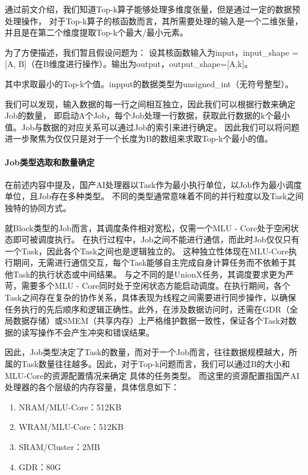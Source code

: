         通过前文介绍，我们知道Top-k算子能够处理多维度张量，但是通过一定的数据预处理操作，
        对于Top-k算子的核函数而言，其所需要处理的输入是一个二维张量，并且是在第二个维度提取Top-k个最大/最小元素。
        
        为了方便描述，我们暂且假设问题为：
        设其核函数输入为input，input\_shape = [A, B]（在B维度进行操作）。输出为output，output\_shape=[A,k]。

        其中求取最小的Top-k个值。inpput的数据类型为unsigned\_int（无符号整型）。
        
        我们可以发现，输入数据的每一行之间相互独立，因此我们可以根据行数来确定Job的数量，
        即启动A个Job，每个Job处理一行数据，获取此行数据的k个最小值。Job与数据的对应关系可以通过Job的索引来进行确定。
        因此我们可以将问题进一步聚焦为仅仅只是对于一个长度为B的数组来求取Top-k个最小的值。

        
        \paragraph{Job类型选取和数量确定}
        在前述内容中提及，国产AI处理器以Task作为最小执行单位，以Job作为最小调度单位，且Job存在多种类型。
        不同的类型通常意味着不同的并行粒度以及Task之间独特的协同方式。

        就Block类型的Job而言，其调度条件相对宽松，仅需一个MLU - Core处于空闲状态即可被调度执行。
        在执行过程中，Job之间不能进行通信，而此时Job仅仅只有一个Task，因此各个Task之间也是逻辑独立的。
        这种独立性体现在MLU-Core执行期间，无需进行通信交互，每个Task能够自主完成自身计算任务而不依赖于其他Task的执行状态或中间结果。
        与之不同的是UnionX任务，其调度要求更为严苛，需要多个MLU - Core同时处于空闲状态方能启动调度。在执行期间，各个Task之间存在复杂的协作关系，具体表现为线程之间需要进行同步操作，以确保任务执行的先后顺序和逻辑正确性。此外，在涉及数据访问时，还需在GDR（全局数据存储）或SMEM（共享内存）上严格维护数据一致性，保证各个Task对数据的读写操作不会产生冲突和错误结果。
        
        因此，Job类型决定了Task的数量，而对于一个Job而言，往往数据规模越大，所属的Task数量往往越多。因此，对于Top-k问题而言，我们可以通过B的大小和MLU-Core的资源配置情况来确定
        具体的任务类型。
        而这里的资源配置指国产AI处理器的各个层级的内存容量，具体信息如下：
\begin{enumerate}
    \item NRAM/MLU-Core：512KB
    \item WRAM/MLU-Core：512KB
    \item SRAM/Cluster：2MB
     \item         GDR：80G

\end{enumerate}
        



